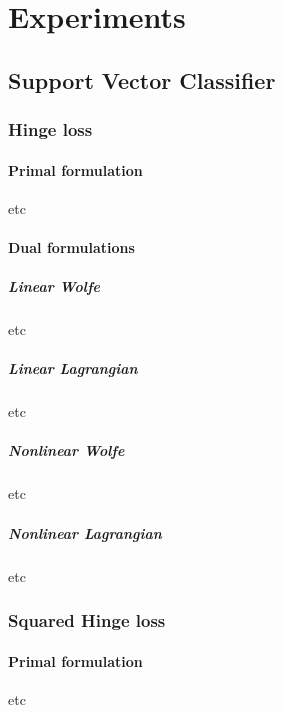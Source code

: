 \section{Experiments}


\subsection{Support Vector Classifier}


\subsubsection{Hinge loss}

\paragraph{Primal formulation}

etc



\paragraph{Dual formulations}

\subparagraph{Linear Wolfe}

etc



\subparagraph{Linear Lagrangian}

etc



\subparagraph{Nonlinear Wolfe}

etc



\subparagraph{Nonlinear Lagrangian}

etc




\subsubsection{Squared Hinge loss}

\paragraph{Primal formulation}

etc

